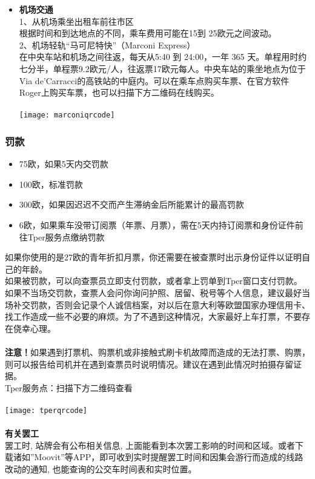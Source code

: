 \begin{itemize}
\item  \textbf{机场交通}\\
1、从机场乘坐出租车前往市区\\
根据时间和到达地点的不同，乘车费用可能在15到 25欧元之间波动。\\
2、机场轻轨“马可尼特快”（Marconi Express）\\
在中央车站和机场之间往返，每天从5:40 到 24:00，一年 365 天。单程用时约七分半，单程票9.2欧元/人，往返票17欧元每人。中央车站的乘坐地点为位于Via de'Carracci的高铁站的中庭内。可以在乘车点购买车票、在官方软件Roger上购买车票，也可以扫描下方二维码在线购买。\\
\\
\texttt{[image: marconiqrcode]}


\end{itemize}


\subsubsection{罚款}
\begin{itemize}
\item  75欧，如果5天内交罚款
\item  100欧，标准罚款
\item  300欧，如果因迟迟不交而产生滞纳金后所能累计的最高罚款
\item  6欧，如果乘车没带订阅票（年票、月票），需在5天内持订阅票和身份证件前往Tper服务点缴纳罚款
\end{itemize}
如果你使用的是27欧的青年折扣月票，你还需要在被查票时出示身份证件以证明自己的年龄。\\
如果被罚款，可以向查票员立即支付罚款，或者拿上罚单到Tper窗口支付罚款。如果不当场交罚款，查票人会问你询问护照、居留、税号等个人信息，建议最好当场补交罚款，否则会记录个人诚信档案，对以后在意大利等欧盟国家办理信用卡、找工作造成一些不必要的麻烦。为了不遇到这种情况，大家最好上车打票，不要存在侥幸心理。\\
\\
\textbf{注意！}如果遇到打票机、购票机或非接触式刷卡机故障而造成的无法打票、购票，则可以报告给司机并在遇到查票员时说明情况。建议在遇到此情况时拍摄存留证据。\\
Tper服务点：扫描下方二维码查看\\
\\
\texttt{[image: tperqrcode]}
\\
\\
\textbf{有关罢工}\\
罢工时, 站牌会有公布相关信息, 上面能看到本次罢工影响的时间和区域。或者下载诸如”Moovit”等APP，即可收到实时提醒罢工时间和因集会游行而造成的线路改动的通知, 也能查询的公交车时间表和实时位置。\\



